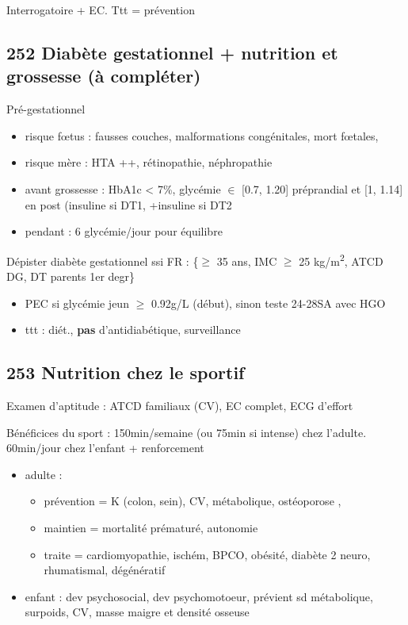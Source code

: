 \documentclass[11pt]{article}
\begin{document}
Interrogatoire + EC. Ttt = prévention
\subsection{252 Diabète gestationnel + nutrition et grossesse (à compléter)}
\label{sec:org0365044}
Pré-gestationnel
\begin{itemize}
\item risque f\oe{}tus : fausses couches, malformations congénitales, mort f\oe{}tales,
\item risque mère : HTA ++, rétinopathie, néphropathie
\item avant grossesse : HbA1c < 7\%, glycémie \(\in\) [0.7, 1.20] préprandial et [1,
1.14] en post (\inc insuline si DT1, +insuline si DT2
\item pendant : 6 glycémie/jour pour équilibre
\end{itemize}
Dépister diabète gestationnel ssi FR : \{\(\ge\) 35 ans, IMC \(\ge\) 25 kg/m\textsuperscript{2}, ATCD DG,
DT parents 1er degr\}
\begin{itemize}
\item PEC si glycémie jeun \(\ge\) 0.92g/L (début), sinon teste 24-28SA avec HGO
\item ttt : diét., \textbf{pas} d'antidiabétique, surveillance
\end{itemize}

\subsection{253 Nutrition chez le sportif}
\label{sec:org5629b1b}
Examen d'aptitude : ATCD familiaux (CV),  EC complet, ECG d'effort

Bénéficices du sport : 150min/semaine (ou 75min si intense) chez
l'adulte. 60min/jour chez l'enfant + renforcement
\begin{itemize}
\item adulte : 
\begin{itemize}
\item prévention = K (colon, sein), CV, métabolique, ostéoporose \female,
\item maintien = \dec mortalité prématuré, \inc autonomie
\item traite = cardiomyopathie, ischém, BPCO, obésité, diabète 2 neuro,
rhumatismal, dégénératif
\end{itemize}
\item enfant : dev psychosocial, dev psychomotoeur, prévient sd métabolique,
surpoids, CV, \inc masse maigre et densité osseuse
\end{itemize}
\end{document}

